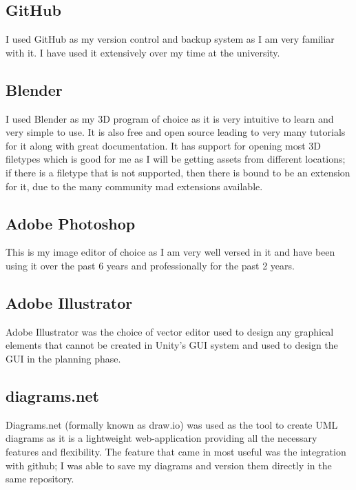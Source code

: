 \documentclass[12pt]{report}
\begin{document}
\subsection{GitHub}
I used GitHub as my version control and backup system as I am very familiar with it. I have used it extensively over my time at the university.

\subsection{Blender}
I used Blender as my 3D program of choice as it is very intuitive to learn and very simple to use. It is also free and open source leading to very many tutorials for it along with great documentation. It has support for opening most 3D filetypes which is good for me as I will be getting assets from different locations; if there is a filetype that is not supported, then there is bound to be an extension for it, due to the many community mad extensions available.

\subsection{Adobe Photoshop}
This is my image editor of choice as I am very well versed in it and have been using it over the past 6 years and professionally for the past 2 years.

\subsection{Adobe Illustrator}
Adobe Illustrator was the choice of vector editor used to design any graphical elements that cannot be created in Unity's GUI system and used to design the GUI in the planning phase. 

\subsection{diagrams.net}
Diagrams.net (formally known as draw.io) was used as the tool to create UML diagrams as it is a lightweight web-application providing all the necessary features and flexibility. The feature that came in most useful was the integration with github; I was able to save my diagrams and version them directly in the same repository.
\end{document}
